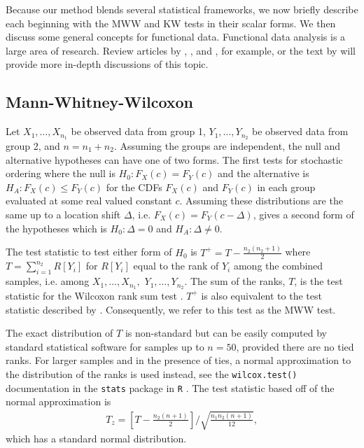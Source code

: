 \documentclass[12pt]{article}
\theoremstyle{plain}
\theoremstyle{remark}
\begin{document}
	Because our method blends several statistical frameworks, we now briefly describe each beginning with the MWW and KW tests in their scalar forms. We then discuss some general concepts for functional data. Functional data analysis is a large area of research. Review articles by \cite{Morris2015}, \cite{Wang2016}, and \cite{Greven2017}, for example, or the text by \cite{Ramsay2005} will provide more in-depth discussions of this topic.
	
	\subsection{Mann-Whitney-Wilcoxon}
	
	Let $X_1, \ldots, X_{n_1}$ be observed data from group 1, $Y_1, \ldots, Y_{n_2}$ be observed data from group 2, and $n = n_1 + n_2$. Assuming the groups are independent, the null and alternative hypotheses can have one of two forms. The first tests for stochastic ordering where the null is $H_0: F_X(c) = F_Y(c)$ and the alternative is $H_A: F_X(c) \leq F_Y(c)$ for the CDFs $F_X(c)$ and $F_Y(c)$ in each group evaluated at some real valued constant $c$. Assuming these distributions are the same up to a location shift $\Delta$, i.e. $F_X(c) = F_Y(c-\Delta)$, gives a second form of the hypotheses which is $H_0: \Delta = 0$ and $H_A: \Delta \neq 0$. 
	
%	
	The test statistic to test either form of $H_0$ is $T^+ = T - \frac{n_2(n_2 + 1)}{2}$ where $T = \sum_{i=1}^{n_2} R[Y_i]$ for $R[Y_i]$ equal to the rank of $Y_i$ among the combined samples, i.e. among $X_1, \ldots, X_{n_1},$ $Y_1, \ldots, Y_{n_2}$. The sum of the ranks, $T$, is the test statistic for the Wilcoxon rank sum test \citep{Wilcoxon1945,Kloke2015}. $T^+$ is also equivalent to the test statistic described by \cite{MannWhitney1947}. Consequently, we refer to this test as the MWW test.
	
	The exact distribution of $T$ is non-standard but can be easily computed by standard statistical software for samples up to $n = 50$, provided there are no tied ranks. For larger samples and in the presence of ties, a normal approximation to the distribution of the ranks is used instead, see the \texttt{wilcox.test()} documentation in the \texttt{stats} package in \texttt{R} \citep{Stats2022}. The test statistic based off of the normal approximation is
	\begin{align*}
		T_z = \left[T - \frac{n_2(n+1)}{2}\right]\bigg/ \sqrt{\frac{n_1 n_2 (n+1)}{12}},
	\end{align*}
	which has a standard normal distribution.
\end{document}
